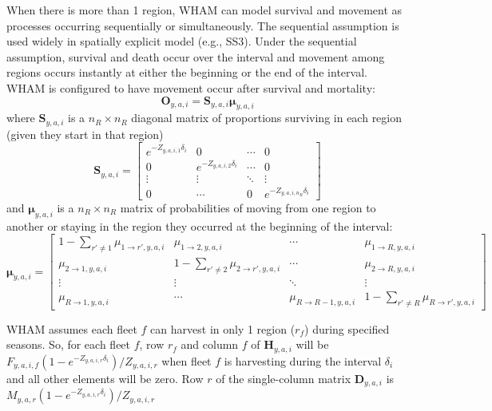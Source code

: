 \documentclass[
]{article}
\begin{document}
When there is more than 1 region, WHAM can model survival and movement
as processes occurring sequentially or simultaneously. The sequential
assumption is used widely in spatially explicit model (e.g., SS3). Under
the sequential assumption, survival and death occur over the interval
and movement among regions occurs instantly at either the beginning or
the end of the interval. WHAM is configured to have movement occur after
survival and mortality: \begin{equation*}
  \mathbf{O}_{y,a,i} = \mathbf{S}_{y,a,i}\boldsymbol{\mu}_{y,a,i}
\end{equation*} where \(\mathbf{S}_{y,a,i}\) is a \(n_R \times n_R\)
diagonal matrix of proportions surviving in each region (given they
start in that region) \begin{equation*}
\mathbf{S}_{y,a,i} = 
  \begin{bmatrix}
    e^{-Z_{y,a,i,1}\delta_i} & 0 & \cdots & 0 \\
    0 & e^{-Z_{y,a,i,2}\delta_i} & \cdots & 0 \\
    \vdots & \vdots & \ddots & \vdots \\
    0 & \cdots & 0 & e^{-Z_{y,a,i,n_R}\delta_i}
  \end{bmatrix}
\end{equation*} and \(\boldsymbol{\mu}_{y,a,i}\) is a \(n_R \times n_R\)
matrix of probabilities of moving from one region to another or staying
in the region they occurred at the beginning of the interval:
\begin{equation*}
\boldsymbol{\mu}_{y,a,i} = 
  \begin{bmatrix}
    1-\sum_{r' \neq 1} \mu_{1\rightarrow r',y,a,i} & \mu_{1\rightarrow 2,y,a,i} & \cdots & \mu_{1\rightarrow R,y,a,i} \\
    \mu_{2\rightarrow 1,y,a,i} & 1-\sum_{r' \neq 2} \mu_{2\rightarrow r',y,a,i} & \cdots & \mu_{2\rightarrow R,y,a,i} \\
    \vdots & \vdots & \ddots & \vdots \\
    \mu_{R\rightarrow 1,y,a,i} & \cdots & \mu_{R\rightarrow R-1,y,a,i} & 1-\sum_{r' \neq R} \mu_{R\rightarrow r',y,a,i}
  \end{bmatrix}
\end{equation*}

WHAM assumes each fleet \(f\) can harvest in only 1 region (\(r_f\))
during specified seasons. So, for each fleet \(f\), row \(r_f\) and
column \(f\) of \(\mathbf{H}_{y,a,i}\) will be
\(F_{y,a,i,f}\left(1 - e^{-Z_{y,a,i,r}\delta_i}\right)/Z_{y,a,i,r}\)
when fleet \(f\) is harvesting during the interval \(\delta_i\) and all
other elements will be zero. Row \(r\) of the single-column matrix
\(\mathbf{D}_{y,a,i}\) is
\(M_{y,a,r}\left(1 - e^{-Z_{y,a,i,r}\delta_i}\right)/Z_{y,a,i,r}\)
\end{document}
